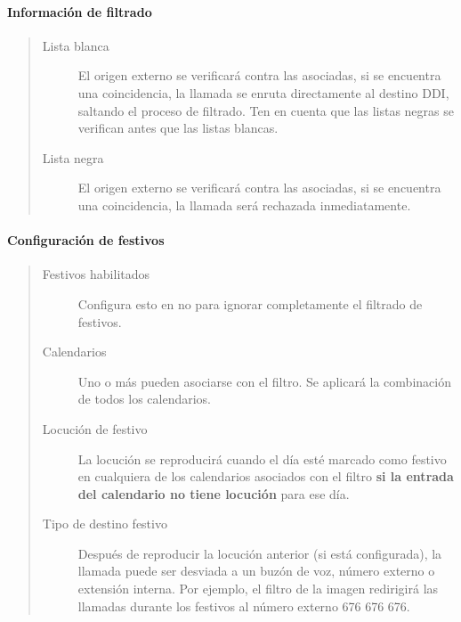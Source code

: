 \documentclass[letterpaper,10pt,spanish]{sphinxmanual}
\begin{document}
\paragraph{Información de filtrado}
\label{administration_portal/client/vpbx/routing_tools/external_call_filters:filtering-info}\begin{quote}
\begin{description}
\item[{Lista blanca}] \leavevmode
El origen externo se verificará contra las {\hyperref[administration_portal/client/vpbx/routing_tools/match_lists:match\string-lists]{}} asociadas, si se encuentra una coincidencia, la llamada se enruta directamente al destino DDI, saltando el proceso de filtrado. Ten en cuenta que las listas negras se verifican antes que las listas blancas.

\item[{Lista negra}] \leavevmode
El origen externo se verificará contra las {\hyperref[administration_portal/client/vpbx/routing_tools/match_lists:match\string-lists]{}} asociadas, si se encuentra una coincidencia, la llamada será rechazada inmediatamente.

\end{description}
\end{quote}


\paragraph{Configuración de festivos}
\label{administration_portal/client/vpbx/routing_tools/external_call_filters:holidays-configuration}\begin{quote}
\begin{description}
\item[{Festivos habilitados}] \leavevmode
Configura esto en no para ignorar completamente el filtrado de festivos.

\item[{Calendarios}] \leavevmode
Uno o más {\hyperref[administration_portal/client/vpbx/routing_tools/calendars:calendars]{}} pueden asociarse con el filtro. Se aplicará la combinación de todos los calendarios.

\item[{Locución de festivo}] \leavevmode
La locución se reproducirá cuando el día esté marcado como festivo en cualquiera de los calendarios asociados con el filtro \textbf{si la entrada del calendario no tiene locución} para ese día.

\item[{Tipo de destino festivo}] \leavevmode
Después de reproducir la locución anterior (si está configurada), la llamada puede ser desviada a un buzón de voz, número externo o extensión interna. Por ejemplo, el filtro de la imagen redirigirá las llamadas durante los festivos al número externo 676 676 676.

\end{description}
\end{quote}
\end{document}
